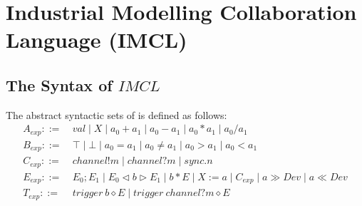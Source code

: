 \section{Industrial Modelling Collaboration Language (IMCL)}
\subsection{The Syntax of $IMCL$}

The abstract syntactic sets of \emph{} is defined as follows:
\begin{equation*}
    \begin{aligned}
        A_{exp} ::= &\ val \mid X \mid a_{0} + a_{1} \mid a_{0} - a_{1} \mid a_{0} * a_{1} \mid a_{0} / a_{1} \\
        B_{exp} ::= &\ \top \mid \bot \mid a_{0} = a_{1} \mid a_{0} \neq a_{1} \mid a_{0} > a_{1} \mid a_{0} < a_{1} \\
        C_{exp} ::= &\ channel!m \mid channel?m \mid sync.n \\
        E_{exp} ::= &\ E_{0};E_{1} \mid E_{0} \triangleleft b \triangleright E_{1} \mid b * E \mid X := a \mid C_{exp} \mid a \gg Dev \mid a \ll Dev \\
        T_{exp} ::= &\ trigger \ b \diamond E \mid trigger \ channel?m \diamond E  \\
    \end{aligned}
\end{equation*}

